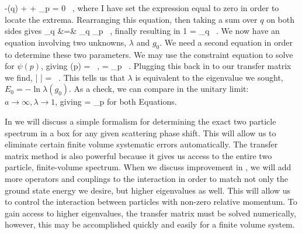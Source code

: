 \beq
-\lambda \psi(q) +  + \sum_p  = 0 \ ,
\eeq
where I have set the expression equal to zero in order to locate the extrema. Rearranging this equation, then taking a sum over $q$ on both sides gives
\beq
\sum_q &=& \sum_q   \sum_p  \ ,
\eeq
finally resulting in
\beq
\label{eq:eigeqlambda}
1 = \sum_q  \ .
\eeq
We now have an equation involving two unknowns, $\lambda$ and $g_0$. We need a second equation in order to determine these two parameters. We may use the constraint equation to solve for $\psi(p)$, giving
\beq
\label{eq:varpsi}
\psi(p) = {}  \ , \qquad {} =  \sum_p  \ .
\eeq
Plugging this back in to our transfer matrix we find,
\beq
\langle \Psi | {} | \Psi \rangle = \lambda \ .
\eeq
This tells us that $\lambda$ is equivalent to the eigenvalue we sought, $E_0 = -\ln \lambda(g_0)$. As a check, we can compare  in the unitary limit: $a \to \infty, \lambda \to 1$, giving
\beq
{} = \sum_p 
\eeq
for both Equations.

In  we will discuss a simple formalism for determining the exact two particle spectrum in a box for any given scattering phase shift. This will allow us to eliminate certain finite volume systematic errors automatically. The transfer matrix method is also powerful because it gives us access to the entire two particle, finite-volume spectrum. When we discuss improvement in , we will add more operators and couplings to the interaction in order to match not only the ground state energy we desire, but higher eigenvalues as well. This will allow us to control the interaction between particles with non-zero relative momentum. To gain access to higher eigenvalues, the transfer matrix must be solved numerically, however, this may be accomplished quickly and easily for a finite volume system. 

